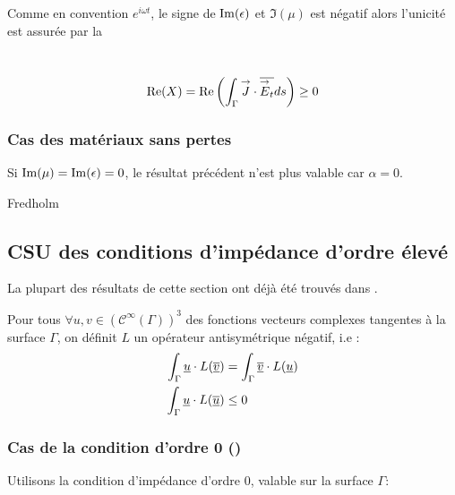 			Comme en convention \(e^{i\omega t}\), le signe de \(\operatorname{Im}(\epsilon)\) et \(\Im(\mu)\) est négatif
			alors l'unicité est assurée par la
			\begin{defn}~\\
				\begin{equation}\label{eq:unicite:form_var:cgu}
					\operatorname{Re}(X) = \operatorname{Re}\left(\int_\Gamma {\overset{\rightarrow}{J}} \cdot {\overline{{\overset{\rightarrow}{E}}_t}} ds\right) \ge 0
				\end{equation}
			\end{defn}

		\subsubsection{Cas des matériaux sans pertes}

			Si \(\operatorname{Im}(\mu) = \operatorname{Im}(\epsilon) = 0\), le résultat précédent n'est plus valable car \(\alpha = 0\).

			\begin{TODO}
  Fredholm
\end{TODO}

	\subsection{CSU des conditions d'impédance d'ordre élevé}

		La plupart des résultats de cette section ont déjà été trouvés dans \cite{stupfel_sufficient_2011}.


		Pour tous \(\forall u, v \in (\mathcal C^\infty(\Gamma))^3\) des fonctions vecteurs complexes tangentes à la surface \(\Gamma\), on définit \(L\) un opérateur antisymétrique négatif, i.e : 
		\begin{align*}
			\int_\Gamma \underline{u}\cdot L({\overline{\underline{v}}}) &= \int_\Gamma {\overline{\underline{v}}}\cdot L(\underline{u})\\
			\int_\Gamma \underline{u}\cdot L({\overline{\underline{u}}}) &\le 0
		\end{align*}

		\subsubsection{Cas de la condition d'ordre 0 (\cite{stupfel_sufficient_2011})}
			Utilisons la condition d’impédance d'ordre 0, valable sur la surface \(\Gamma\): 

